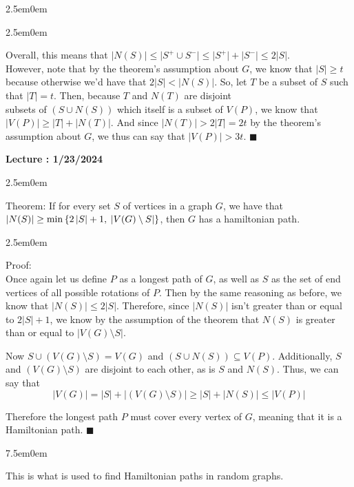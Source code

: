 \documentclass{book}
\newcommand{\hTwo}{%
   \color{MidnightBlue}%
   \fontsize{13}{15}\selectfont%
}
\newcommand{\hThree}{%
   \color{PineGreen}
   \fontsize{13}{15}\selectfont%
}
\newcommand{\teachComment}{
   \color{Orange}%
   \fontsize{12}{14}\selectfont%
}
\newenvironment{myIndent}{%
   \begin{adjustwidth}{2.5em}{0em}%
}{%
   \end{adjustwidth}%
}
\newenvironment{myTindent}{%
   \begin{adjustwidth}{7.5em}{0em}%
}{%
   \end{adjustwidth}%
}
\newcommand{\uuline}[2][.]{%
{\vphantom{a}\color{#1}%
\rlap{\rule[-0.18em]{\widthof{#2}}{0.06em}}%
\rlap{\rule[-0.32em]{\widthof{#2}}{0.06em}}}%
#2}
\newcounter{LectureNumber}
\newcommand*{\markLecture}[1]{%
   \stepcounter{LectureNumber}%
   {\huge \color{Black} \textbf{Lecture \theLectureNumber: #1} \newline}%
}
\newcommand{\retTwo}{\hfill\bigbreak}
\begin{document}
{\begin{myIndent}
{\begin{myIndent}
      Overall, this means that $\lvert N(S) \rvert \leq \lvert S^+ \cup S^- \rvert \leq \lvert S^+ \rvert + \lvert S^- \rvert \leq 2 \lvert S \rvert$.\\ However, note that by the theorem's assumption about $G$, we know that $\left|S\right| \geq t$ because otherwise we'd have that $ 2\left| S \right| < \left|N(S)\right|$. So, let $T$ be a subset of $S$ such that $\left| T \right| = t$. Then, because $T$ and $N(T)$ are disjoint\\ subsets of $(S \cup N(S))$ which itself is a subset of $V(P)$, we know that\\ $\left| V(P) \right| \geq \left| T \right| + \left| N(T) \right|$. And since $\left| N(T) \right| > 2\left| T \right| = 2t$ by the theorem's assumption about $G$, we thus can say that $\left| V(P) \right| > 3t$. $\blacksquare$ \retTwo
   \end{myIndent}}
\end{myIndent}}

\markLecture{1/23/2024}

{\begin{myIndent} \hTwo
   \uuline{Theorem}: If for every set $S$ of vertices in a graph $G$, we have that\\ $\left| N(S) \right| \geq \min{\{2\left|S\right| + 1, \hspace{0.25em} \left|V(G) \setminus S \right|\}}$, then $G$ has a hamiltonian path. \retTwo

   {\begin{myIndent} \hThree
      Proof:\\ Once again let us define $P$ as a longest path of $G$, as well as $S$ as the set of end vertices of all possible rotations of $P$. Then by the same reasoning as before, we know that $\left| N(S) \right| \leq 2 \left| S \right|$. Therefore, since $\left| N(S) \right|$ isn't greater than or equal to $2 \left| S \right| + 1$, we know by the assumption of the theorem that $N(S)$ is greater than or equal to $\left|V(G) \setminus S \right|$. \retTwo

      Now $S \cup (V(G) \setminus S) = V(G)$ and $(S \cup N(S)) \subseteq V(P)$. Additionally, $S$ and $(V(G) \setminus S)$ are disjoint to each other, as is $S$ and $N(S)$. Thus, we can say that \[
         \left| V(G) \right| = \left| S \right| + \left| (V(G) \setminus S) \right| \geq \left| S \right| + \left| N(S) \right| \leq \left| V(P) \right| \]
      
      Therefore the longest path $P$ must cover every vertex of $G$, meaning that it is a Hamiltonian path. $\blacksquare$\retTwo
      {\begin{myTindent} \teachComment
         This is what is used to find Hamiltonian paths in random graphs.
      \end{myTindent}}
   \end{myIndent}}
\end{myIndent}}
\end{document}

